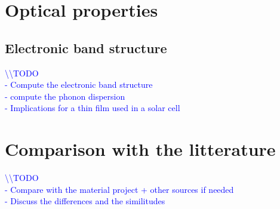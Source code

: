 \documentclass[11pt,a4paper]{article}
\begin{document}
\section{Optical properties}
\subsection{Electronic band structure}

\textcolor{blue}{
\textbackslash\textbackslash TODO\\
- Compute the electronic band structure\\
- compute the phonon dispersion\\
- Implications for a thin film used in a solar cell}
\newpage
\section{Comparison with the litterature}
\textcolor{blue}{
\textbackslash\textbackslash TODO\\
- Compare with the material project + other sources if needed\\
- Discuss the differences and the similitudes}
\newpage
\end{document}
